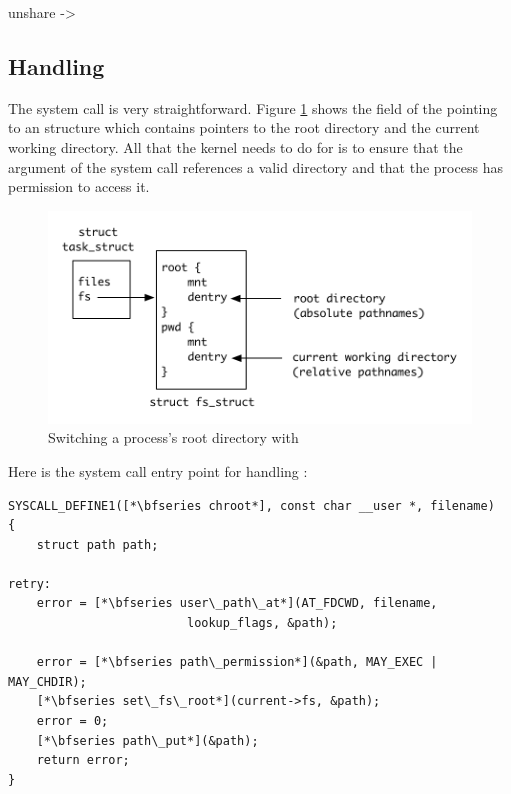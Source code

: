 unshare -> 


\subsection{Handling }

The  system call is very straightforward. Figure \ref{fig:chroot-fields} shows the  field of the  pointing to an  structure which contains pointers to the root directory and the current working directory. All that the kernel needs to do for  is to ensure that the  argument of the system call references a valid directory and that the process has permission to access it.

\begin{figure}[h]
	\includegraphics[scale=0.6]{figures/chroot-fields.pdf}
	\centering
	\caption{Switching a process's root directory with }
	\label{fig:chroot-fields}
\end{figure}

\noindent
Here is the system call entry point for handling :

\begin{lstlisting}
SYSCALL_DEFINE1([*\bfseries chroot*], const char __user *, filename)
{   
    struct path path;

retry:
    error = [*\bfseries user\_path\_at*](AT_FDCWD, filename, 
                         lookup_flags, &path);
    
    error = [*\bfseries path\_permission*](&path, MAY_EXEC | MAY_CHDIR);
    [*\bfseries set\_fs\_root*](current->fs, &path);
    error = 0;
    [*\bfseries path\_put*](&path);
    return error;
}
\end{lstlisting}

